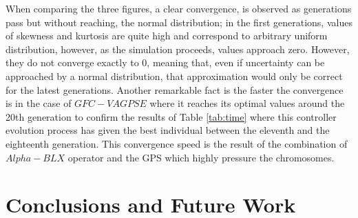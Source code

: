 \documentclass[10pt,journal,compsoc]{IEEEtran}
\begin{document}
When comparing the three figures, a clear convergence, 
is observed as generations pass but without reaching, the normal distribution; in the first
generations, values of skewness and kurtosis are quite
high and correspond to arbitrary uniform distribution, however, as the simulation proceeds, values
approach zero. However, they do not converge
exactly to 0, meaning that, even if uncertainty can be
approached by a normal distribution, that approximation
would only be correct for the latest generations\cite{noisylunch2015}.
Another remarkable fact is the faster the convergence is in the case of $GFC-VAGPSE$ where it reaches its optimal values around the 20th generation to confirm the results of Table \ref{tab:time} where this controller evolution process has given the best individual between the eleventh and the eighteenth generation.
This convergence speed is the result of the combination of $Alpha-BLX$ operator and the GPS which highly pressure the chromosomes.

\section{Conclusions and Future Work} 
\label{sec:conclusions}





\end{document}
